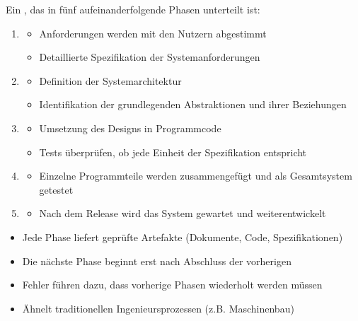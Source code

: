     Ein , das in fünf aufeinanderfolgende Phasen unterteilt ist:
    \begin{enumerate}
        \item {}
        \begin{itemize}
            \item Anforderungen werden mit den Nutzern abgestimmt
            \item Detaillierte Spezifikation der Systemanforderungen
        \end{itemize}
        \item {}
        \begin{itemize}
            \item Definition der Systemarchitektur
            \item Identifikation der grundlegenden Abstraktionen und ihrer Beziehungen
        \end{itemize}
        \item {}
        \begin{itemize}
            \item Umsetzung des Designs in Programmcode
            \item Tests überprüfen, ob jede Einheit der Spezifikation entspricht
        \end{itemize}
        \item {}
        \begin{itemize}
            \item Einzelne Programmteile werden zusammengefügt und als Gesamtsystem getestet
        \end{itemize}
        \item {}
        \begin{itemize}
            \item Nach dem Release wird das System gewartet und weiterentwickelt
        \end{itemize}
    \end{enumerate}
    \begin{itemize}
        \item Jede Phase liefert geprüfte Artefakte (Dokumente, Code, Spezifikationen)
        \item Die nächste Phase beginnt erst nach Abschluss der vorherigen
        \item Fehler führen dazu, dass vorherige Phasen wiederholt werden müssen
        \item Ähnelt traditionellen Ingenieursprozessen (z.B. Maschinenbau)
    \end{itemize}

